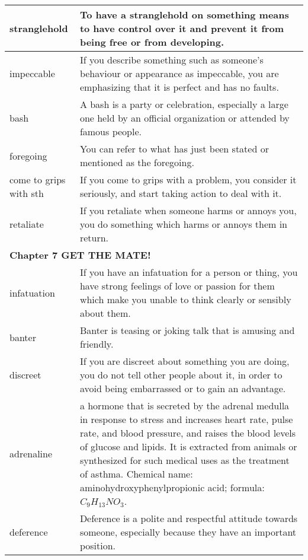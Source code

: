 \documentclass{article}
\begin{document}
\begin{center}
\begin{longtable}{|l|p{9cm}|}
\hline
stranglehold
&
To have a stranglehold on something means to have control over it and prevent it from being free or from developing.
\\

\hline
impeccable
&
If you describe something such as someone's behaviour or appearance as impeccable, you are emphasizing that it is perfect and has no faults.
\\

\hline
bash
&
A bash is a party or celebration, especially a large one held by an official organization or attended by famous people.
\\

\hline
foregoing
&
You can refer to what has just been stated or mentioned as the foregoing.
\\

\hline
come to grips with sth
&
If you come to grips with a problem, you consider it seriously, and start taking action to deal with it.
\\

\hline
retaliate
&
If you retaliate when someone harms or annoys you, you do something which harms or annoys them in return.
\\

\hline
\multicolumn{2}{|l|}{\textbf{Chapter 7 GET THE MATE!}}
\\

\hline
infatuation
&
If you have an infatuation for a person or thing, you have strong feelings of love or passion for them which make you unable to think clearly or sensibly about them.
\\

\hline
banter
&
Banter is teasing or joking talk that is amusing and friendly.
\\

\hline
discreet
&
If you are discreet about something you are doing, you do not tell other people about it, in order to avoid being embarrassed or to gain an advantage.
\\

\hline
adrenaline
&
a hormone that is secreted by the adrenal medulla in response to stress and increases heart rate, pulse rate, and blood pressure, and raises the blood levels of glucose and lipids. It is extracted from animals or synthesized for such medical uses as the treatment of asthma. Chemical name: aminohydroxyphenylpropionic acid; formula: $C_{9}H_{13}NO_{3}$.
\\

\hline
deference
&
Deference is a polite and respectful attitude towards someone, especially because they have an important position.
\\


\end{longtable}
\end{center}
\end{document}
